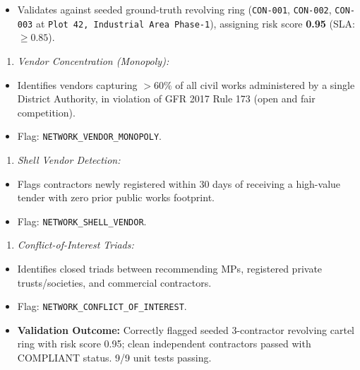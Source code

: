 \documentclass[11pt,a4paper]{article}
\begin{document}
\begin{itemize}[leftmargin=1.5em, itemsep=2pt, topsep=3pt]
\item Validates against seeded ground-truth revolving ring (\texttt{CON-001}, \texttt{CON-002}, \texttt{CON-003} at \texttt{Plot 42, Industrial Area Phase-1}), assigning risk score \textbf{0.95} (SLA: $\ge 0.85$).
\end{itemize}
\begin{enumerate}[leftmargin=1.5em, itemsep=2pt, topsep=3pt]
\item \textit{Vendor Concentration (Monopoly):}
\end{enumerate}
\begin{itemize}[leftmargin=1.5em, itemsep=2pt, topsep=3pt]
\item Identifies vendors capturing $> 60\%$ of all civil works administered by a single District Authority, in violation of GFR 2017 Rule 173 (open and fair competition).
\item Flag: \texttt{NETWORK\_VENDOR\_MONOPOLY}.
\end{itemize}
\begin{enumerate}[leftmargin=1.5em, itemsep=2pt, topsep=3pt]
\item \textit{Shell Vendor Detection:}
\end{enumerate}
\begin{itemize}[leftmargin=1.5em, itemsep=2pt, topsep=3pt]
\item Flags contractors newly registered within 30 days of receiving a high-value tender with zero prior public works footprint.
\item Flag: \texttt{NETWORK\_SHELL\_VENDOR}.
\end{itemize}
\begin{enumerate}[leftmargin=1.5em, itemsep=2pt, topsep=3pt]
\item \textit{Conflict-of-Interest Triads:}
\end{enumerate}
\begin{itemize}[leftmargin=1.5em, itemsep=2pt, topsep=3pt]
\item Identifies closed triads between recommending MPs, registered private trusts/societies, and commercial contractors.
\item Flag: \texttt{NETWORK\_CONFLICT\_OF\_INTEREST}.
\item \textbf{Validation Outcome:} Correctly flagged seeded 3-contractor revolving cartel ring with risk score 0.95; clean independent contractors passed with COMPLIANT status. 9/9 unit tests passing.
\end{itemize}
\end{document}

